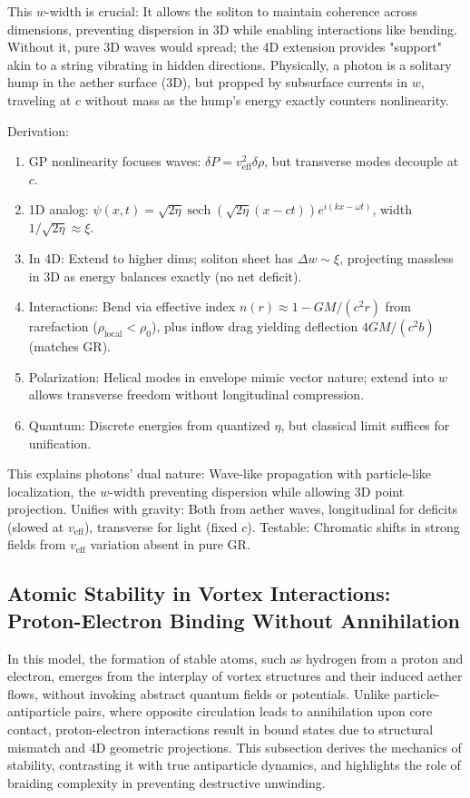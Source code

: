 \documentclass{article}
\DeclareMathOperator{\sech}{sech}
\begin{document}
This $w$-width is crucial: It allows the soliton to maintain coherence across dimensions, preventing dispersion in 3D while enabling interactions like bending. Without it, pure 3D waves would spread; the 4D extension provides "support" akin to a string vibrating in hidden directions. Physically, a photon is a solitary hump in the aether surface (3D), but propped by subsurface currents in $w$, traveling at $c$ without mass as the hump's energy exactly counters nonlinearity.

Derivation:
\begin{enumerate}
\item GP nonlinearity focuses waves: $\delta P = v_{\text{eff}}^2 \delta \rho$, but transverse modes decouple at $c$.
\item 1D analog: $\psi(x,t) = \sqrt{2 \eta} \sech(\sqrt{2 \eta} (x - c t)) e^{i (k x - \omega t)}$, width $1 / \sqrt{2 \eta} \approx \xi$.
\item In 4D: Extend to higher dims; soliton sheet has $\Delta w \sim \xi$, projecting massless in 3D as energy balances exactly (no net deficit).
\item Interactions: Bend via effective index $n(r) \approx 1 - GM/(c^2 r)$ from rarefaction ($\rho_{\text{local}} < \rho_0$), plus inflow drag yielding deflection $4 GM / (c^2 b)$ (matches GR).
\item Polarization: Helical modes in envelope mimic vector nature; extend into $w$ allows transverse freedom without longitudinal compression.
\item Quantum: Discrete energies from quantized $\eta$, but classical limit suffices for unification.
\end{enumerate}

This explains photons' dual nature: Wave-like propagation with particle-like localization, the $w$-width preventing dispersion while allowing 3D point projection. Unifies with gravity: Both from aether waves, longitudinal for deficits (slowed at $v_{\text{eff}}$), transverse for light (fixed $c$). Testable: Chromatic shifts in strong fields from $v_{\text{eff}}$ variation absent in pure GR.

\subsection{Atomic Stability in Vortex Interactions: Proton-Electron Binding Without Annihilation}

In this model, the formation of stable atoms, such as hydrogen from a proton and electron, emerges from the interplay of vortex structures and their induced aether flows, without invoking abstract quantum fields or potentials. Unlike particle-antiparticle pairs, where opposite circulation leads to annihilation upon core contact, proton-electron interactions result in bound states due to structural mismatch and 4D geometric projections. This subsection derives the mechanics of stability, contrasting it with true antiparticle dynamics, and highlights the role of braiding complexity in preventing destructive unwinding.
\end{document}
